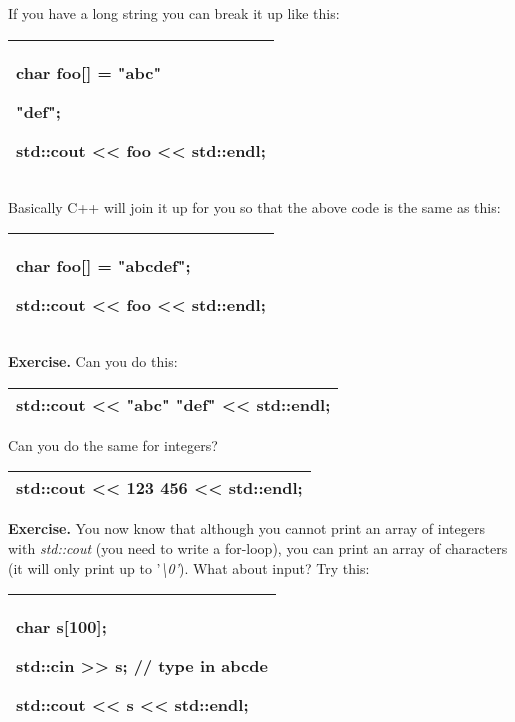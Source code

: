 \documentclass[
]{article}
\begin{document}
If you have a long string you can break it up like this:

\begin{longtable}[]{@{}l@{}}
\toprule
\endhead
\begin{minipage}[t]{0.97\columnwidth}\raggedright
char foo{[}{]} = \textbf{"abc"}

\textbf{ "def"};

std::cout \textless\textless{} foo \textless\textless{} std::endl;\strut
\end{minipage}\tabularnewline
\bottomrule
\end{longtable}

Basically C++ will join it up for you so that the above code is the same
as this:

\begin{longtable}[]{@{}l@{}}
\toprule
\endhead
\begin{minipage}[t]{0.97\columnwidth}\raggedright
char foo{[}{]} = \textbf{"abcdef"};

std::cout \textless\textless{} foo \textless\textless{} std::endl;\strut
\end{minipage}\tabularnewline
\bottomrule
\end{longtable}

\textbf{Exercise.} Can you do this:

\begin{longtable}[]{@{}l@{}}
\toprule
\endhead
std::cout \textless\textless{} \textbf{"abc" "def"} \textless\textless{}
std::endl;\tabularnewline
\bottomrule
\end{longtable}

Can you do the same for integers?

\begin{longtable}[]{@{}l@{}}
\toprule
\endhead
std::cout \textless\textless{} 123\textbf{ }456 \textless\textless{}
std::endl;\tabularnewline
\bottomrule
\end{longtable}

\textbf{Exercise.} You now know that although you cannot print an array
of integers with \emph{std::cout} (you need to write a for-loop), you
can print an array of characters (it will only print up to
'\emph{\textbackslash0'}). What about input? Try this:

\begin{longtable}[]{@{}l@{}}
\toprule
\endhead
\begin{minipage}[t]{0.97\columnwidth}\raggedright
char s{[}100{]};

std::cin \textgreater\textgreater{} s; // type in abcde

std::cout \textless\textless{} s \textless\textless{} std::endl;\strut
\end{minipage}\tabularnewline
\bottomrule
\end{longtable}
\end{document}
